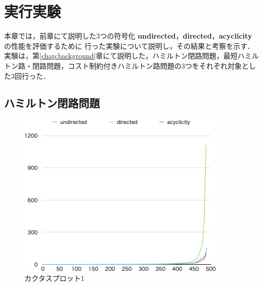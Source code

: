 \chapter{実行実験}\label{chap:experiment}
本章では，前章にて説明した3つの符号化
\textbf{undirected}，\textbf{directed}，\textbf{acyclicity}
の性能を評価するために
行った実験について説明し，その結果と考察を示す．
実験は，第\ref{chap:background}章にて説明した，ハミルトン閉路問題，最短ハミルトン路・閉路問題，コスト制約付きハミルトン路問題の3つをそれぞれ対象とした3回行った．

\section{ハミルトン閉路問題}

\begin{figure}[tb]
\begin{center}
  \includegraphics[width=10cm]{fig/cactus.png}
\caption{カクタスプロット1}
\label{cactus}
\end{center}
\end{figure}


